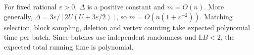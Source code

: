 \documentclass[12pt]{article}
\newcommand{\E}{\mathbb E}
\begin{document}
For fixed rational \(\varepsilon>0\), \(\Delta\) is a positive constant and \(m=O(n)\). More generally, \(\Delta=3\varepsilon/[2U(U+3\varepsilon/2)]\), so \(m=O(n(1+\varepsilon^{-2}))\). Matching selection, block sampling, deletion and vertex counting take
expected polynomial time per batch. Since batches use independent
randomness and $\E B<2$, the expected total running time is polynomial.
\end{document}
